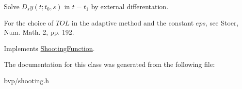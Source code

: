 Solve $D_s y(t; t_0, s)$ in $t = t_1$ by external differentation. 

For the choice of $TOL$ in the adaptive method and the constant $eps$, see Stoer, Num. Math. 2, pp. 192. 

Implements \hyperlink{classShootingFunction_a41360056996ee70c43c4538acd6e28d8}{Shooting\+Function}.



The documentation for this class was generated from the following file\+:\begin{DoxyCompactItemize}
\item 
bvp/shooting.\+h\end{DoxyCompactItemize}
